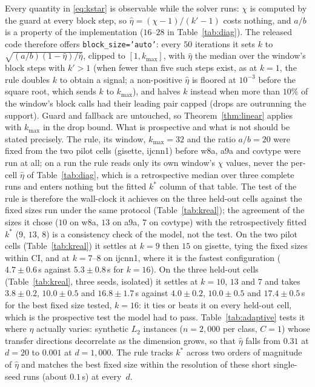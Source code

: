 Every quantity in \eqref{eq:kstar} is observable while the solver runs:
$\chi$ is computed by the guard at every block step, so
$\hat\eta=(\chi-1)/(k'-1)$ costs nothing, and $a/b$ is a property of
the implementation ($16$--$28$ in Table~\ref{tab:diag}). The released
code therefore offers \texttt{block\_size='auto'}: every $50$ iterations
it sets $k$ to $\sqrt{(a/b)(1-\hat\eta)/\hat\eta}$, clipped to $[1,k_{\max}]$,
with $\hat\eta$ the median over the window's block steps with $k'>1$
(when fewer than five such steps exist, as at $k=1$, the rule doubles
$k$ to obtain a signal; a non-positive $\hat\eta$ is floored at $10^{-3}$
before the square root, which sends $k$ to $k_{\max}$), and halves $k$ instead when
more than $10\%$ of the window's block calls had their leading pair
capped (drops are outrunning the support). Guard and fallback are
untouched, so Theorem~\ref{thm:linear} applies with $k_{\max}$ in the
drop bound. What is prospective and what is not should be stated
precisely. The rule, its window, $k_{\max}=32$ and the ratio $a/b=20$
were fixed from the two pilot cells (gisette, ijcnn1) before w8a, a9a
and covtype were run at all; on a run the rule reads only its own
window's $\chi$ values, never the per-cell $\hat\eta$ of
Table~\ref{tab:diag}, which is a retrospective median over three
complete runs and enters nothing but the fitted $k^*$ column of that
table. The test of the rule is therefore the wall-clock it achieves on
the three held-out cells against the fixed sizes run under the same
protocol (Table~\ref{tab:kreal}); the agreement of the sizes it chose
($10$ on w8a, $13$ on a9a, $7$ on covtype) with the retrospectively
fitted $k^*$ ($9$, $13$, $8$) is a consistency check of the model, not
the test. On
the two pilot cells (Table~\ref{tab:kreal}) it settles at $k{=}9$ then
$15$ on gisette, tying the fixed sizes within CI, and at $k{=}7$--$8$ on
ijcnn1, where it is the fastest configuration ($4.7\pm0.6$\,s against
$5.3\pm0.8$\,s for $k{=}16$). On the three held-out cells
(Table~\ref{tab:kreal}, three seeds, isolated) it settles at $k=10$,
$13$ and $7$ and takes $3.8\pm0.2$, $10.0\pm0.5$ and $16.8\pm1.7$\,s
against $4.0\pm0.2$, $10.0\pm0.5$ and $17.4\pm0.5$\,s for the best fixed
size tested, $k{=}16$: it ties or beats it on every held-out cell,
which is the prospective test the model had to pass. Table~\ref{tab:adaptive} tests it where
$\eta$ actually varies: synthetic $L_2$ instances ($n{=}2{,}000$ per
class, $C{=}1$) whose transfer directions decorrelate as the dimension
grows, so that $\hat\eta$ falls from $0.31$ at $d{=}20$ to $0.001$ at
$d{=}1{,}000$. The rule tracks $k^*$ across two orders of magnitude of
$\hat\eta$ and matches the best fixed size within the resolution of these
short single-seed runs (about $0.1$\,s) at every~$d$.

